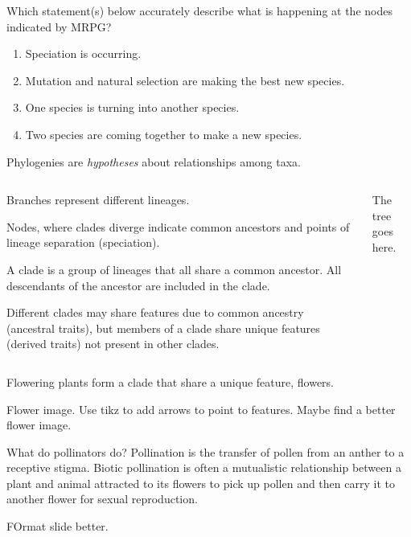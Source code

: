 \documentclass[t]{beamer}
\newcommand{\ques}[1]{\highlight{\textsc{q#1:}}}
\begin{document}
%
\begin{frame}[t]{\ques5 Which statement(s) below accurately describe what is happening at the nodes indicated by MRPG?}

	\begin{enumerate}
		\item Speciation is occurring.
		
		\item Mutation and natural selection are making the best new species.  
		
		\item One species is turning into another species.
		
		\item Two species are coming together to make a new species.
	\end{enumerate}
\end{frame}
%
\begin{frame}[t]{Phylogenies are \emph{hypotheses} about relationships among taxa.}
	
	\begin{columns}[t]
		\begin{column}{0.6\textwidth}
			\hangpara Branches represent different lineages.  

			\hangpara Nodes, where clades diverge indicate common ancestors and points of lineage separation (speciation).

			\hangpara A clade is a group of lineages that all share a common ancestor. All descendants of the ancestor are included in the clade.
			
			\hangpara Different clades may share features due to common ancestry (ancestral traits), but members of a clade share unique features (derived traits) not present in other clades.
		\end{column}
		\begin{column}{0.35\textwidth}
			The tree goes here.
		\end{column}
	\end{columns}
\end{frame}
%
\begin{frame}[t]{Flowering plants form a clade that share a unique feature, flowers.}
	
	\hangpara Flower image. Use tikz to add arrows to point to features. Maybe find a better flower image.
	
\end{frame}
%
\begin{frame}[t]{What do pollinators do?}
	\hangpara Pollination is the transfer of pollen from an anther to a receptive stigma. Biotic pollination is often a mutualistic relationship between a plant and animal attracted to its flowers to pick up pollen and then carry it to another flower for sexual reproduction. 

	\hangpara FOrmat slide better.
	
\end{frame}
\end{document}
